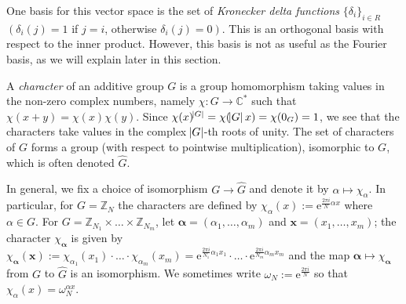 \documentclass[11pt]{article}
\theoremstyle{definition}
\newcommand{\Z}{\mathbb{Z}}
\newcommand{\C}{\mathbb{C}}
\begin{document}
One basis for this vector space is the set of \emph{Kronecker delta functions} $\{\delta_i\}_{i \in R}$ $\left(\delta_i(j) = 1\right.$ if $j=i$, otherwise $\left. \delta_i(j) = 0\right)$.
This is an orthogonal basis with respect to the inner product.
However, this basis is not as useful as the Fourier basis, as we will explain later in this section.

A \emph{character} of an additive group $G$ is a group homomorphism taking values in the non-zero complex numbers, namely $\chi: G \rightarrow \C^*$ such that $\chi(x+y) = \chi(x) \chi(y)$. Since $\chi(x)^{\abs{G}} = \chi(\abs{G} x) = \chi(0_G) = 1$, we see that the characters take values in the complex $\abs{G}$-th roots of unity. The set of characters of $G$ forms a group (with respect to pointwise multiplication), isomorphic to $G$, which is often denoted $\widehat{G}$.

In general, we fix a choice of isomorphism $G \to \widehat{G}$ and denote it by $\alpha \mapsto \chi_\alpha$.
In particular, for $G=\Z_N$ the characters are defined by $\chi_\alpha (x) := \mathrm{e}^{\frac{2\pi i}{N} \alpha x}$ where $\alpha\in G$. For $G = \Z_{N_1} \times \ldots \times \Z_{N_m}$, let $\boldsymbol{\alpha}= \left(\alpha_1,\dots,\alpha_m \right)$ and $\boldsymbol{x} = (x_1,\dots,x_m)$; the character $\chi_{\boldsymbol{\alpha}}$  is given by $\chi_{\boldsymbol{\alpha}}(\boldsymbol{x}) :=  \chi_{\alpha_1}(x_1) \cdot \ldots \cdot \chi_{\alpha_m}(x_m) = \mathrm{e}^{\frac{2\pi i}{N_1} \alpha_1 x_1} \cdot \ldots \cdot \mathrm{e}^{\frac{2\pi i}{N_m} \alpha_m x_m}$ and the map $\boldsymbol{\alpha}\mapsto \chi_{\boldsymbol{\alpha}}$ from $G$ to $\widehat{G}$ is an isomorphism.
We sometimes write $\omega_N := \mathrm{e}^{\frac{2\pi i}{N}}$ so that $\chi_\alpha(x) = \omega_N^{\alpha x}$.

%
\end{document}
